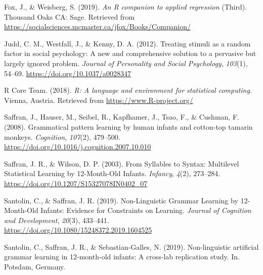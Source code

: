 \begin{appendix}
\leavevmode\hypertarget{ref-fox2019}{}%
Fox, J., \& Weisberg, S. (2019). \emph{An R companion to applied
regression} (Third). Thousand Oaks CA: Sage. Retrieved from
\url{https://socialsciences.mcmaster.ca/jfox/Books/Companion/}

\leavevmode\hypertarget{ref-judd2012}{}%
Judd, C. M., Westfall, J., \& Kenny, D. A. (2012). Treating stimuli as a
random factor in social psychology: A new and comprehensive solution to
a pervasive but largely ignored problem. \emph{Journal of Personality
and Social Psychology}, \emph{103}(1), 54--69.
\url{https://doi.org/10.1037/a0028347}

\leavevmode\hypertarget{ref-rcoreteam2018}{}%
R Core Team. (2018). \emph{R: A language and environment for statistical
computing}. Vienna, Austria. Retrieved from
\url{https://www.R-project.org/}

\leavevmode\hypertarget{ref-saffran2008}{}%
Saffran, J., Hauser, M., Seibel, R., Kapfhamer, J., Tsao, F., \&
Cushman, F. (2008). Grammatical pattern learning by human infants and
cotton-top tamarin monkeys. \emph{Cognition}, \emph{107}(2), 479--500.
\url{https://doi.org/10.1016/j.cognition.2007.10.010}

\leavevmode\hypertarget{ref-saffran2003}{}%
Saffran, J. R., \& Wilson, D. P. (2003). From Syllables to Syntax:
Multilevel Statistical Learning by 12-Month-Old Infants. \emph{Infancy},
\emph{4}(2), 273--284. \url{https://doi.org/10.1207/S15327078IN0402_07}

\leavevmode\hypertarget{ref-santolin2019}{}%
Santolin, C., \& Saffran, J. R. (2019). Non-Linguistic Grammar Learning
by 12-Month-Old Infants: Evidence for Constraints on Learning.
\emph{Journal of Cognition and Development}, \emph{20}(3), 433--441.
\url{https://doi.org/10.1080/15248372.2019.1604525}

\leavevmode\hypertarget{ref-santolin2019a}{}%
Santolin, C., Saffran, J. R., \& Sebastian-Galles, N. (2019).
Non-linguistic artificial grammar learning in 12-month-old infants: A
cross-lab replication study. In. Potsdam, Germany.

\endgroup
\end{appendix}
